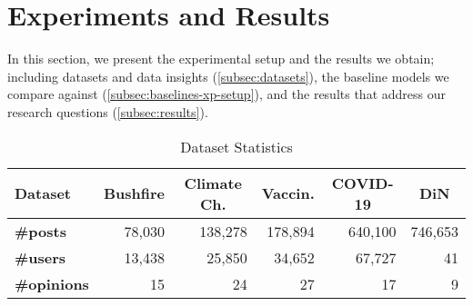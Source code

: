 

\section{Experiments and Results}
In this section, we present the experimental setup and the results we obtain; 
including datasets and data insights (\cref{subsec:datasets}), 
the baseline models we compare against (\cref{subsec:baselines-xp-setup}), and 
the results that address our research questions (\cref{subsec:results}).
\begin{table}[t]
    \caption{Dataset Statistics}
    \setlength{\tabcolsep}{3pt}
    \centering
    \begin{tabular}{@{}lrrrr|r@{}}
        \toprule
        \textbf{Dataset} & \multicolumn{1}{c}{Bushfire} & \multicolumn{1}{c}{Climate Ch.} & \multicolumn{1}{c}{Vaccin.} & \multicolumn{1}{c|}{COVID-19} & \multicolumn{1}{c}{DiN} \\ \midrule
        \textbf{\#posts}                     & 78,030                       & 138,278                            & 178,894                         & 640,100                       & 746,653                 \\
        \textbf{\#users}                     & 13,438                       & 25,850                             & 34,652                          & 67,727                        & 41                      \\
        \textbf{\#opinions}                  & 15                           & 24                                 & 27                              & 17                            & 9                       \\ \bottomrule
    \end{tabular}
    \label{tab:data_statistics}
\end{table}
